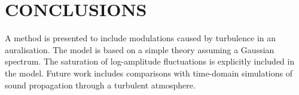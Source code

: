 \section{CONCLUSIONS}
A method is presented to include modulations caused by turbulence in an auralisation.
The model is based on a simple theory assuming a Gaussian spectrum. The saturation of log-amplitude fluctuations is explicitly included in the model.
Future work includes comparisons with time-domain simulations of sound propagation through a turbulent atmosphere.


